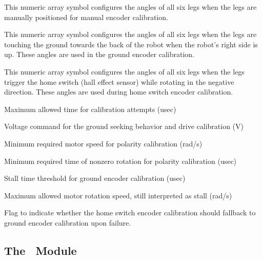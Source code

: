 \begin{itemize}

\par
This numeric array symbol configures the angles of all six legs when the
legs are manually positioned for manual encoder calibration.

\par
This numeric array symbol configures the angles of all six legs when the
legs are touching the ground towards the back of the robot when the robot's
right side is up. These angles are used in the ground encoder calibration.

\par
This numeric array symbol configures the angles of all six legs when the
legs trigger the home switch (hall effect sensor) while rotating in the
negative direction. These angles are used during home switch encoder
calibration.

\par
Maximum allowed time for calibration attempts (usec)

 \par
Voltage command for the ground seeking behavior and drive calibration (V)

 \par
Minimum required motor speed for polarity calibration (rad/s)

 \par
Minimum required time of nonzero rotation for polarity calibration (usec)

 \par
Stall time threshold for ground encoder calibration (usec)

 \par
Maximum allowed motor rotation speed, still interpreted as stall (rad/s)

 \par
Flag to indicate whether the home switch encoder calibration should fallback
to ground encoder calibration upon failure.

\end{itemize}

\subsection{The \WalkMachine\ Module}
\label{sec:walk_machine}

